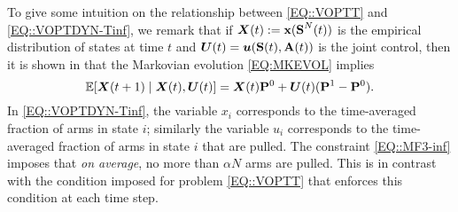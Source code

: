 To give some intuition on the relationship between \eqref{EQ::VOPTT} and \eqref{EQ::VOPTDYN-Tinf}, we remark that if ${\bm{X}(t)} := \textbf{x}(\textbf{S}^{N}(t))$ is the empirical distribution of states at time $t$ and $\bm{U}(t)=\bm{u}(\textbf{S}(t),\textbf{A}(t))$ is the joint control, then it is shown in \citet{GGY23b} that the Markovian evolution \eqref{EQ:MKEVOL} implies
\begin{equation}
\mathbb{E}[{\bm{X}(t + 1)} \mid {\bm{X}(t)}, \bm{U}(t)] = {\bm{X}}{(t)}  \mathbf{P}^{0} +  \bm{U}(t)(\mathbf{P}^{1} - \mathbf{P}^{0}).
\label{EQ:evolution_mf}
\end{equation}
In \eqref{EQ::VOPTDYN-Tinf}, the variable $x_i$ corresponds to the time-averaged fraction of arms in state $i$; similarly the variable $u_i$ corresponds to the time-averaged fraction of arms in state $i$ that are pulled. The constraint \eqref{EQ::MF3-inf} imposes that \emph{on average}, no more than $\alpha N$ arms are pulled. This is in contrast with the condition imposed for problem \eqref{EQ::VOPTT} that enforces this condition at each time step. 







